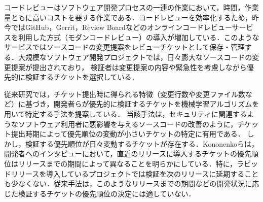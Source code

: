\documentclass[T,J]{fose} %
\newcommand{\todo}[1]{\colorbox{yellow}{{\bf TODO}:}{\color{red} {\textbf{[#1]}}}}
\newcommand{\change}[1]{\colorbox{green}{{\bf CHANGE}:}{\color{black} {\textbf{[#1]}}}}
\begin{document}
コードレビューはソフトウェア開発プロセスの一連の作業において，時間，作業量ともに高いコストを要する作業である\cite{cost}．コードレビューを効率化するため，昨今ではGitHub，Gerrit，Review Boardなどのオンラインコードレビューサービスを利用した方式（モダンコードレビュー\cite{quality1}）の導入が増加している．このようなサービスではソースコードの変更提案をレビューチケットとして保存・管理する．大規模なソフトウェア開発プロジェクトでは，日々膨大なソースコードの変更提案が提出されており，
検証者は変更提案の内容や緊急性を考慮しながら優先的に検証するチケットを選択している\cite{integrator}．


従来研究では，チケット提出時に得られる特徴（変更行数や変更ファイル数など）に基づき，開発者らが優先的に検証するチケットを機械学習アルゴリズムを用いて特定する手法を提案している\cite{prioritizer}\cite{review_prioritize_pineapple}．
当該手法は，セキュリティに関連するようなソフトウェア利用者に悪影響を与えるソースコードの改善のように，チケット提出時期によって優先順位の変動が小さいチケットの特定に有用である．
しかし，検証する優先順位が日々変動するチケットが存在する．Kononenkoらは，開発者へのインタビューにおいて，直近のリリースに導入するチケットの優先順位はリリースまでの期間によって異なることを明らかにしている\cite{release_merge}．特に，ラピッドリリースを導入しているプロジェクトでは検証を次のリリースに延期することも少なくない．従来手法は，このようなリリースまでの期間などの開発状況に応じた検証するチケットの優先順位の決定には適していない．


\end{document}
